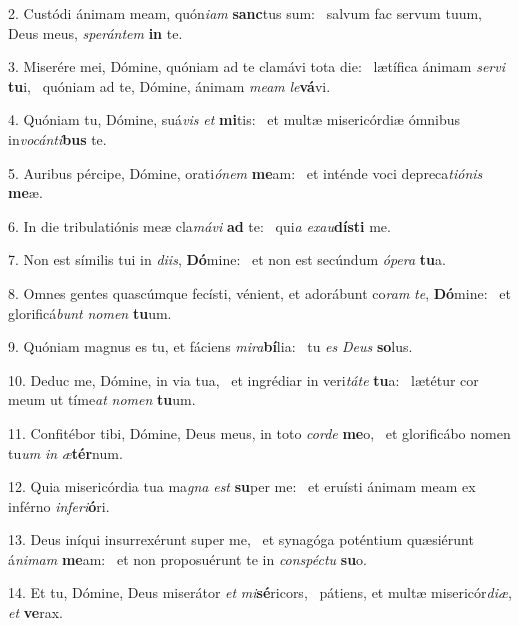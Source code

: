 2. Custódi ánimam meam, quón\textit{i}\textit{am} \textbf{sanc}tus sum: \ast\  salvum fac servum tuum, Deus meus, \textit{spe}\textit{rán}\textit{tem} \textbf{in} te.\

3. Miserére mei, Dómine, quóniam ad te clamávi tota die: \dag\  lætífica ánimam \textit{ser}\textit{vi} \textbf{tu}i, \ast\  quóniam ad te, Dómine, ánimam \textit{me}\textit{am} \textit{le}\textbf{vá}vi.\

4. Quóniam tu, Dómine, suá\textit{vis} \textit{et} \textbf{mi}tis: \ast\  et multæ misericórdiæ ómnibus in\textit{vo}\textit{cán}\textit{ti}\textbf{bus} te.\

5. Auribus pércipe, Dómine, orati\textit{ó}\textit{nem} \textbf{me}am: \ast\  et inténde voci depreca\textit{ti}\textit{ó}\textit{nis} \textbf{me}æ.\

6. In die tribulatiónis meæ cla\textit{má}\textit{vi} \textbf{ad} te: \ast\  qui\textit{a} \textit{ex}\textit{au}\textbf{dís}\textbf{ti} me.\

7. Non est símilis tui in \textit{di}\textit{is}, \textbf{Dó}mine: \ast\  et non est secúndum \textit{ó}\textit{pe}\textit{ra} \textbf{tu}a.\

8. Omnes gentes quascúmque fecísti, vénient, et adorábunt co\textit{ram} \textit{te}, \textbf{Dó}mine: \ast\  et glorificá\textit{bunt} \textit{no}\textit{men} \textbf{tu}um.\

9. Quóniam magnus es tu, et fáciens \textit{mi}\textit{ra}\textbf{bí}lia: \ast\  tu \textit{es} \textit{De}\textit{us} \textbf{so}lus.\

10. Deduc me, Dómine, in via tua, \dag\  et ingrédiar in veri\textit{tá}\textit{te} \textbf{tu}a: \ast\  lætétur cor meum ut tíme\textit{at} \textit{no}\textit{men} \textbf{tu}um.\

11. Confitébor tibi, Dómine, Deus meus, in toto \textit{cor}\textit{de} \textbf{me}o, \ast\  et glorificábo nomen tu\textit{um} \textit{in} \textit{æ}\textbf{tér}num.\

12. Quia misericórdia tua ma\textit{gna} \textit{est} \textbf{su}per me: \ast\  et eruísti ánimam meam ex inférno \textit{in}\textit{fe}\textit{ri}\textbf{ó}ri.\

13. Deus iníqui insurrexérunt super me, \dag\  et synagóga poténtium quæsiérunt á\textit{ni}\textit{mam} \textbf{me}am: \ast\  et non proposuérunt te in \textit{con}\textit{spéc}\textit{tu} \textbf{su}o.\

14. Et tu, Dómine, Deus miserátor \textit{et} \textit{mi}\textbf{sé}ricors, \ast\  pátiens, et multæ misericór\textit{di}\textit{æ}, \textit{et} \textbf{ve}rax.\

